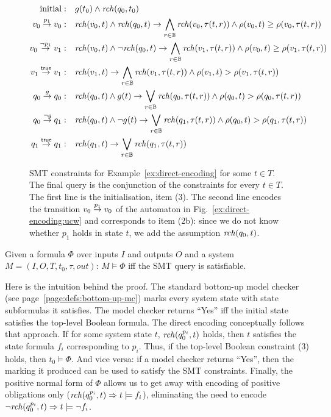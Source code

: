 \begin{figure}[t]\center
\small
\begin{align*}
\text{initial}:~~~
& g(t_0) \land \reach(q_0,t_0) \\
%
\edge{v_0}{p_1}{v_0}:~~~
& \reach(v_0,t) \land \reach(q_0,t)
  \impl
  \bigwedge_{r\in \bbB} 
  \reach(v_0,\tau(t,r)) \land \rank(v_0,t) \geq \rank(v_0,\tau(t,r)) \\
%
\edge{v_0}{\neg p_1}{v_1}:~~~
& \reach(v_0,t) \land \neg\reach(q_0,t)
  \impl
  \bigwedge_{r\in \bbB} 
  \reach(v_1,\tau(t,r)) \land \rank(v_0,t) \geq \rank(v_1,\tau(t,r)) \\
%
\edge{v_1}{\true}{v_1}:~~~
& \reach(v_1,t) 
  \impl
  \bigwedge_{r\in \bbB}
  \reach(v_1,\tau(t,r)) \land \rank(v_1,t) > \rank(v_1,\tau(t,r)) \\
%
\edge{q_0}{g}{q_0}:~~~
& \reach(q_0,t) \land g(t)
  \impl
  \bigvee_{r\in \bbB} 
  \reach(q_0,\tau(t,r)) \land \rank(q_0,t) > \rank(q_0,\tau(t,r)) \\
%
\edge{q_0}{\neg g}{q_1}:~~~
& \reach(q_0,t) \land \neg g(t)
  \impl
  \bigvee_{r\in \bbB} 
  \reach(q_1,\tau(t,r)) \land \rank(q_0,t) > \rank(q_1,\tau(t,r)) \\
%
\edge{q_1}{\true}{q_1}:~~~
& \reach(q_1,t) 
  \impl
  \bigvee_{r\in \bbB}
  \reach(q_1,\tau(t,r))
\end{align*}
\caption{SMT constraints for Example~\ref{ex:direct-encoding} for some $t \in T$.
  The final query is the conjunction of the constraints for every $t \in T$.
  The first line is the initialisation, item (3).
  The second line encodes the transition $v_0 \stackrel{{p_1}}{\rightarrow} v_0$ of the automaton in Fig.~\ref{ex:direct-encoding:ucw}
  and corresponds to item (2b):
  since we do not know whether $p_1$ holds in state $t$,
  we add the assumption $\mathit{rch}(q_0,t)$.}
\label{fig:direct-encoding:ex:constraits}
\end{figure}


\begin{theorem}
Given a \CTLstar formula $\Phi$ over inputs $I$ and outputs $O$
and a system $M=(I,O,T,t_0,\tau,out)$:
$M \models \Phi$
iff the SMT query is satisfiable.
\end{theorem}
Here is the intuition behind the proof.
The standard bottom-up model checker (see page~\ref{page:defs:bottom-up-mc})
marks every system state with state subformulas it satisfies.
The model checker returns ``Yes'' iff the initial state
satisfies the top-level Boolean formula.
The direct encoding conceptually follows that approach.
If for some system state $t$, $\mathit{rch}(q_0^{p_i},t)$ holds,
then $t$ satisfies the state formula $f_i$ corresponding to $p_i$.
Thus, if the top-level Boolean constraint (3) holds,
then $t_0 \models \Phi$.
And vice versa:
if a model checker returns ``Yes'',
then the marking it produced can be used to satisfy the SMT constraints.
Finally, the positive normal form of $\Phi$
allows us to get away with encoding of positive obligations only
($\mathit{rch}(q_0^{p_i},t) \Rightarrow t \models f_i$),
eliminating the need to encode
$\neg\mathit{rch}(q_0^{p_i},t) \Rightarrow t \models \neg f_i$.


